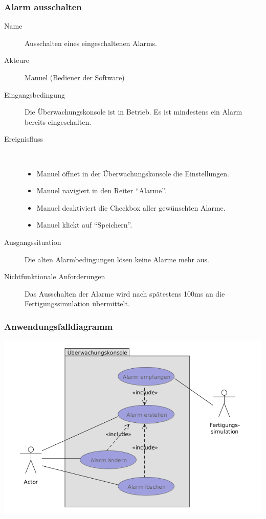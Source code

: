 \documentclass[parskip=full]{scrartcl}
\begin{document}
\subsubsection{Alarm ausschalten}
\begin{description}
 \item[Name] Ausschalten eines eingeschaltenen Alarms.
 \item[Akteure] Manuel (Bediener der Software)
 \item[Eingangsbedingung] Die \"Uberwachungskonsole ist in Betrieb. Es ist mindestens ein Alarm bereits eingeschalten.
 \item[Ereignisfluss]~\\
 \begin{itemize}[noitemsep]
  \item Manuel \"offnet in der \"Uberwachungskonsole die Einstellungen.
  \item Manuel navigiert in den Reiter ``Alarme''.
  \item Manuel deaktiviert die Checkbox aller gew\"unschten Alarme.
  \item Manuel klickt auf ``Speichern''.
 \end{itemize}
 \item[Ausgangssituation] Die alten Alarmbedingungen l\"osen keine Alarme mehr aus.
 \item [Nichtfunktionale Anforderungen] Das Ausschalten der Alarme wird nach sp\"atestens 100ms an die Fertigungssimulation \"ubermittelt.
\end{description}

\subsubsection{Anwendungsfalldiagramm}
\begin{center}
  \includegraphics[scale=0.7]{media/UseCases/Ueberwachungskonsole.png}
\end{center}
\end{document}
